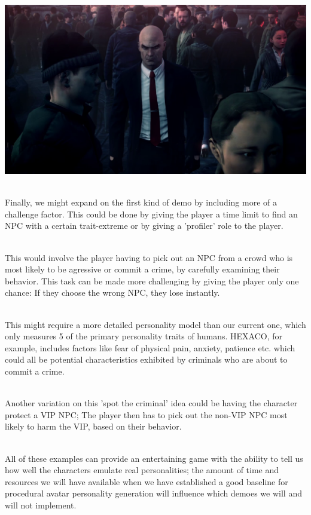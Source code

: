 \documentclass[11pt]{article} %
\begin{document}
~\\
\includegraphics[scale=0.3]{Hitman}

~\\
Finally, we might expand on the first kind of demo by including more of a challenge factor. This could be done by giving the player a time limit to find an NPC with a certain trait-extreme or by giving a 'profiler' role to the player. 

~\\
This would involve the player having to pick out an NPC from a crowd who is most likely to be agressive or commit a crime, by carefully examining their behavior. This task can be made more challenging by giving the player only one chance: If they choose the wrong NPC, they lose instantly. 

~\\
This might require a more detailed personality model than our current one, which only measures 5 of the primary personality traits of humans. HEXACO, for example, includes factors like fear of physical pain, anxiety, patience etc. which could all be potential characteristics exhibited by criminals who are about to commit a crime.

~\\
Another variation on this 'spot the criminal'  idea could be having the character protect a VIP NPC; The player then has to pick out the non-VIP NPC most likely to harm the VIP, based on their behavior. 

~\\
All of these examples can provide an entertaining game with the ability to tell us how well the characters emulate real personalities; the amount of time and resources we will have available when we have established a good baseline for procedural avatar personality generation will influence which demoes we will and will not implement.
\end{document}
